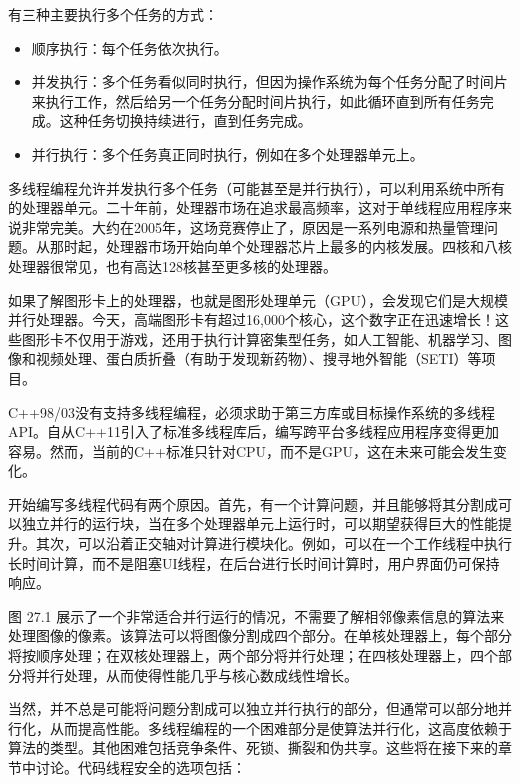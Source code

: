 

有三种主要执行多个任务的方式：

\begin{itemize}
\item
顺序执行：每个任务依次执行。

\item
并发执行：多个任务看似同时执行，但因为操作系统为每个任务分配了时间片来执行工作，然后给另一个任务分配时间片执行，如此循环直到所有任务完成。这种任务切换持续进行，直到任务完成。

\item
并行执行：多个任务真正同时执行，例如在多个处理器单元上。
\end{itemize}

多线程编程允许并发执行多个任务（可能甚至是并行执行），可以利用系统中所有的处理器单元。二十年前，处理器市场在追求最高频率，这对于单线程应用程序来说非常完美。大约在2005年，这场竞赛停止了，原因是一系列电源和热量管理问题。从那时起，处理器市场开始向单个处理器芯片上最多的内核发展。四核和八核处理器很常见，也有高达128核甚至更多核的处理器。

如果了解图形卡上的处理器，也就是图形处理单元（GPU），会发现它们是大规模并行处理器。今天，高端图形卡有超过16,000个核心，这个数字正在迅速增长！这些图形卡不仅用于游戏，还用于执行计算密集型任务，如人工智能、机器学习、图像和视频处理、蛋白质折叠（有助于发现新药物）、搜寻地外智能（SETI）等项目。

C++98/03没有支持多线程编程，必须求助于第三方库或目标操作系统的多线程API。自从C++11引入了标准多线程库后，编写跨平台多线程应用程序变得更加容易。然而，当前的C++标准只针对CPU，而不是GPU，这在未来可能会发生变化。

开始编写多线程代码有两个原因。首先，有一个计算问题，并且能够将其分割成可以独立并行的运行块，当在多个处理器单元上运行时，可以期望获得巨大的性能提升。其次，可以沿着正交轴对计算进行模块化。例如，可以在一个工作线程中执行长时间计算，而不是阻塞UI线程，在后台进行长时间计算时，用户界面仍可保持响应。

图 27.1 展示了一个非常适合并行运行的情况，不需要了解相邻像素信息的算法来处理图像的像素。该算法可以将图像分割成四个部分。在单核处理器上，每个部分将按顺序处理；在双核处理器上，两个部分将并行处理；在四核处理器上，四个部分将并行处理，从而使得性能几乎与核心数成线性增长。


当然，并不总是可能将问题分割成可以独立并行执行的部分，但通常可以部分地并行化，从而提高性能。多线程编程的一个困难部分是使算法并行化，这高度依赖于算法的类型。其他困难包括竞争条件、死锁、撕裂和伪共享。这些将在接下来的章节中讨论。代码线程安全的选项包括：

